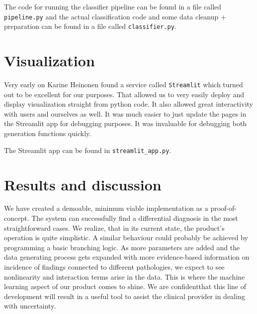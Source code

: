 \documentclass{article}
\begin{document}
The code for running the classifier pipeline can be found in a file called \texttt{pipeline.py} and the actual classification code and some data cleanup + preparation can be found in a file called \texttt{classifier.py}.

\section{Visualization}
Very early on Karine Heinonen found a service called \texttt{Streamlit} which turned out to be excellent for our purposes. That allowed us to very easily deploy and display visualization straight from python code. It also allowed great interactivity with users and ourselves as well. It was much easier to just update the pages in the Streamlit app for debugging purposes. It was invaluable for debugging both generation functions quickly. 

The Streamlit app can be found in \texttt{streamlit\_app.py}.

\section{Results and discussion}
We have created a demoable, minimum viable implementation as a proof-of-concept. The system can successfully find a differential diagnosis in the most straightforward cases. We realize, that in its current state, the product's operation is quite simplistic. A similar behaviour could probably be achieved by programming a basic branching logic. As more parameters are added and the data generating process gets expanded with more evidence-based information on incidence of findings connected to different pathologies, we expect to see nonlinearity and interaction terms arise in the data. This is where the machine learning aspect of our product comes to shine. We are confidentthat this line of development will result in a useful tool to assist the clinical provider in dealing with uncertainty.
\end{document}
